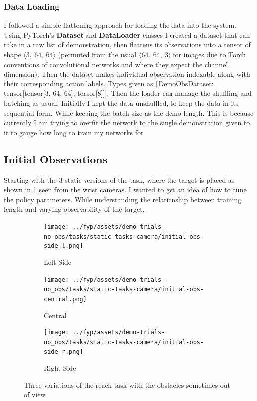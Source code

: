 \subsubsection{Data Loading}
I followed a simple flattening approach for loading the data into the system. Using PyTorch's \textbf{Dataset} and \textbf{DataLoader} classes I created a dataset that can take in a raw list of demonstration, then flattens its observations into a tensor of shape \(\langle 3,~64,~64 \rangle \) (permuted from the usual \(\langle 64,~64,~3 \rangle \) for images due to Torch conventions of convolutional networks and where they expect the channel  dimension). Then the dataset makes individual observation indexable along with their corresponding action labels. Types given as:\texttt|DemoObsDataset: tensor[tensor[3,  64, 64], tensor[8]]|. Then the loader can manage the shuffling and batching as usual. Initially I kept the data unshuffled, to keep the data in its sequential form. While keeping the batch size as the demo length. This is because currently I am trying to overfit the network to the single demonstration given to it to gauge how long to train my networks for

\subsection{Initial Observations}
Starting with the 3 static versions of the task, where the target is placed as shown in \ref{fig:no-obs-3-views} seen from the wrist cameras. I wanted to get an idea of how to tune the policy parameters. While understanding the relationship between training length and varying observability of the target.

\begin{figure}[htbp]
  \begin{subfigure}{0.3\linewidth}
    \centering
    \texttt{[image: ../fyp/assets/demo-trials-no\_obs/tasks/static-tasks-camera/initial-obs-side\_l.png]}      
    \caption{Left Side}
  \end{subfigure}
  \hfill
  \begin{subfigure}{0.3\textwidth}
    \centering
    \texttt{[image: ../fyp/assets/demo-trials-no\_obs/tasks/static-tasks-camera/initial-obs-central.png]}
    \caption{Central}
  \end{subfigure}
  \hfill
  \begin{subfigure}{0.3\linewidth}
    \centering
    \texttt{[image: ../fyp/assets/demo-trials-no\_obs/tasks/static-tasks-camera/initial-obs-side\_r.png]}
    \caption{Right Side}
  \end{subfigure}%
  \caption{Three variations of the reach task with the obstacles sometimes out of view}\label{fig:no-obs-3-views}
\end{figure}

